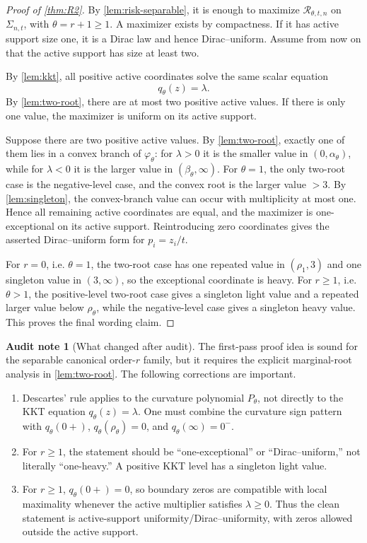 \documentclass[11pt]{article}
\theoremstyle{definition}
\newtheorem{audit}[theorem]{Audit note}
\begin{document}
\begin{proof}[Proof of \cref{thm:R2}]
By \cref{lem:risk-separable}, it is enough to maximize $\mathcal R_{\theta,t,n}$ on $\Sigma_{n,t}$, with $\theta=r+1\ge1$.  A maximizer exists by compactness.  If it has active support size one, it is a Dirac law and hence Dirac--uniform.  Assume from now on that the active support has size at least two.

By \cref{lem:kkt}, all positive active coordinates solve the same scalar equation
\[
  q_\theta(z)=\lambda.
\]
By \cref{lem:two-root}, there are at most two positive active values.  If there is only one value, the maximizer is uniform on its active support.

Suppose there are two positive active values.  By \cref{lem:two-root}, exactly one of them lies in a convex branch of $\varphi_\theta$: for $\lambda>0$ it is the smaller value in $(0,\alpha_\theta)$, while for $\lambda<0$ it is the larger value in $(\beta_\theta,\infty)$.  For $\theta=1$, the only two-root case is the negative-level case, and the convex root is the larger value $>3$.  By \cref{lem:singleton}, the convex-branch value can occur with multiplicity at most one.  Hence all remaining active coordinates are equal, and the maximizer is one-exceptional on its active support.  Reintroducing zero coordinates gives the asserted Dirac--uniform form for $p_i=z_i/t$.

For $r=0$, i.e. $\theta=1$, the two-root case has one repeated value in $(\rho_1,3)$ and one singleton value in $(3,\infty)$, so the exceptional coordinate is heavy.  For $r\ge1$, i.e. $\theta>1$, the positive-level two-root case gives a singleton light value and a repeated larger value below $\rho_\theta$, while the negative-level case gives a singleton heavy value.  This proves the final wording claim.
\end{proof}

\begin{audit}[What changed after audit]
The first-pass proof idea is sound for the separable canonical order-$r$ family, but it requires the explicit marginal-root analysis in \cref{lem:two-root}.  The following corrections are important.
\begin{enumerate}[label=\textup{(\roman*)}]
\item Descartes' rule applies to the curvature polynomial $P_\theta$, not directly to the KKT equation $q_\theta(z)=\lambda$.  One must combine the curvature sign pattern with $q_\theta(0+)$, $q_\theta(\rho_\theta)=0$, and $q_\theta(\infty)=0^-$.
\item For $r\ge1$, the statement should be ``one-exceptional'' or ``Dirac--uniform,'' not literally ``one-heavy.''  A positive KKT level has a singleton light value.
\item For $r\ge1$, $q_\theta(0+)=0$, so boundary zeros are compatible with local maximality whenever the active multiplier satisfies $\lambda\ge0$.  Thus the clean statement is active-support uniformity/Dirac--uniformity, with zeros allowed outside the active support.
\end{enumerate}
\end{audit}
\end{document}
